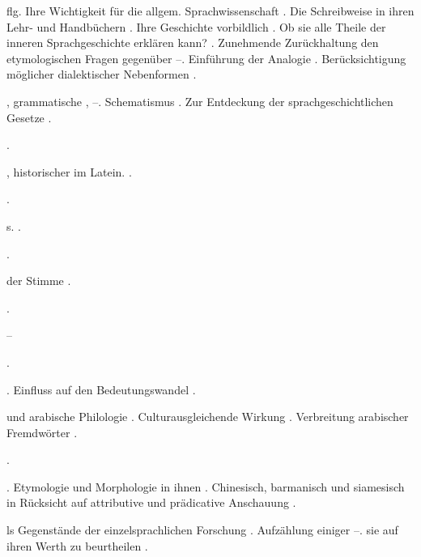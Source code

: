 \begin{register}
 \pageref{sp.29} flg. Ihre Wichtigkeit für die allgem. Sprachwissenschaft \pageref{sp.52}. Die Schreibweise in ihren Lehr- und Handbüchern \pageref{sp.108}. Ihre Geschichte vorbildlich \pageref{sp.137}. Ob sie alle Theile der inneren Sprachgeschichte erklären kann? \pageref{sp.170}. Zunehmende Zurückhaltung den etymologischen Fragen gegenüber \pageref{sp.179}–\pageref{sp.180}.  Einführung der Analogie \pageref{sp.210}. Berücksichtigung möglicher dialektischer Nebenformen \pageref{sp.285}.

, grammatische \pageref{sp.89}, \pageref{sp.91}–\pageref{sp.92}. Schematismus \pageref{sp.93}. Zur Entdeckung der sprachgeschichtlichen Gesetze \pageref{sp.170}.

 \pageref{sp.114}.

, historischer im Latein. \pageref{sp.473}.

 \pageref{sp.348}.

 s. .

 \pageref{sp.102}\sed{, \pageref{sp.241}}.

 der Stimme \pageref{sp.314}.

 \pageref{sp.321}.

 \pageref{sp.101}–\pageref{sp.102}


 \sed{\pageref{sp.390},} \pageref{sp.423}.

. Einfluss auf den Bedeutungswandel \pageref{sp.244}.

 und arabische Philologie \pageref{sp.21}. Culturausgleichende Wirkung \pageref{sp.148}. Verbreitung arabischer Fremdwörter \pageref{sp.231}.

 \pageref{sp.215}.


 \sed{\pageref{sp.257}}. Etymologie und Morphologie in ihnen \pageref{sp.123}. Chinesisch, barmanisch und siamesisch in Rücksicht auf attributive und prädicative Anschauung \sed{\pageref{sp.346},} \pageref{sp.456}.

 ls Gegenstände der einzelsprachlichen Forschung \pageref{sp.61}. Aufzählung einiger \pageref{sp.146}–\pageref{sp.147}.  sie auf ihren Werth zu beurtheilen \pageref{sp.426}.


\end{register}
